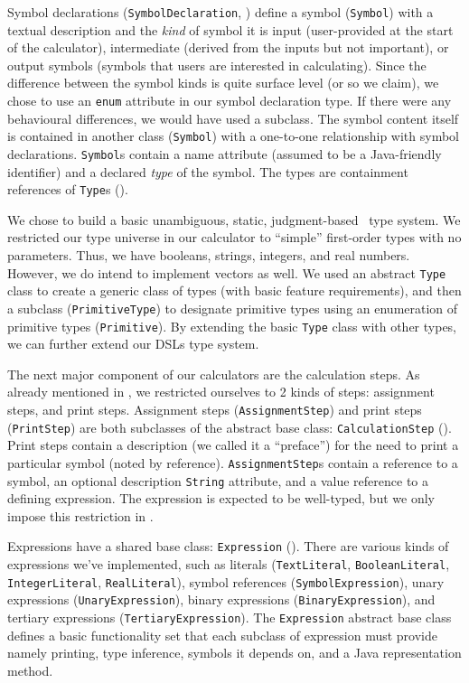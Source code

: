 \documentclass[11pt,fleqn]{article}
\begin{document}
Symbol declarations (\lstinline{SymbolDeclaration},
) define a symbol (\lstinline{Symbol}) with a
textual description and the \textit{kind} of symbol it is \textemdash{} input
(user-provided at the start of the calculator), intermediate (derived from the
inputs but not important), or output symbols (symbols that users are interested
in calculating). Since the difference between the symbol kinds is quite surface
level (or so we claim), we chose to use an \lstinline{enum} attribute in our
symbol declaration type. If there were any behavioural differences, we would
have used a subclass. The symbol content itself is contained in another class
(\lstinline{Symbol}) with a one-to-one relationship with symbol declarations.
\lstinline{Symbol}s contain a name attribute (assumed to be a Java-friendly
identifier) and a declared \textit{type} of the symbol. The types are
containment references of \lstinline{Type}s ().  

We chose to build a basic unambiguous, static,
judgment-based~\cite{nlab:judgment} type system. We restricted our type universe
in our calculator to ``simple'' first-order types with no parameters. Thus, we
have booleans, strings, integers, and real numbers. However, we do intend to
implement vectors as well. We used an abstract \lstinline{Type} class to create
a generic class of types (with basic feature requirements), and then a subclass
(\lstinline{PrimitiveType}) to designate primitive types using an enumeration of
primitive types (\lstinline{Primitive}). By extending the basic \lstinline{Type}
class with other types, we can further extend our DSLs type system.

The next major component of our calculators are the calculation steps. As
already mentioned in , we restricted
ourselves to 2 kinds of steps: assignment steps, and print steps. Assignment
steps (\lstinline{AssignmentStep}) and print steps (\lstinline{PrintStep}) are
both subclasses of the abstract base class: \lstinline{CalculationStep}
(). Print steps contain a description (we called it
a ``preface'') for the need to print a particular symbol (noted by reference).
\lstinline{AssignmentStep}s contain a reference to a symbol, an optional
description \lstinline{String} attribute, and a value reference to a defining
expression. The expression is expected to be well-typed, but we only impose this
restriction in .

Expressions have a shared base class: \lstinline{Expression}
(). There are various kinds of expressions we've
implemented, such as literals (\lstinline{TextLiteral},
\lstinline{BooleanLiteral}, \lstinline{IntegerLiteral},
\lstinline{RealLiteral}), symbol references (\lstinline{SymbolExpression}),
unary expressions (\lstinline{UnaryExpression}), binary expressions
(\lstinline{BinaryExpression}), and tertiary expressions
(\lstinline{TertiaryExpression}). The \lstinline{Expression} abstract base class
defines a basic functionality set that each subclass of expression must provide
\textemdash{} namely printing, type inference, symbols it depends on, and a Java
representation method.
\end{document}
